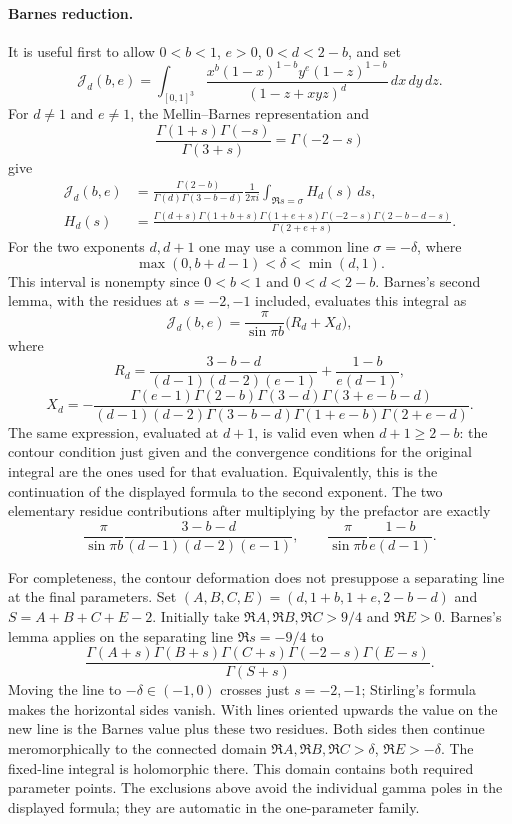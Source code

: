 \documentclass[11pt,a4paper]{article}
\theoremstyle{definition}
\theoremstyle{remark}
\numberwithin{equation}{section}
\begin{document}
\paragraph{Barnes reduction.}
It is useful first to allow $0<b<1$, $e>0$, $0<d<2-b$, and set
\[
 \mathcal J_d(b,e)=\int_{[0,1]^3}
 \frac{x^b(1-x)^{1-b}y^e(1-z)^{1-b}}
 {(1-z+xyz)^d}\,dx\,dy\,dz.
\]
For $d\ne1$ and $e\ne1$, the Mellin--Barnes representation and
\[
 \frac{\Gamma(1+s)\Gamma(-s)}{\Gamma(3+s)}
 =\Gamma(-2-s)
\]
give
\begin{align*}
 \mathcal J_d(b,e)
 &=\frac{\Gamma(2-b)}{\Gamma(d)\Gamma(3-b-d)}\frac{1}{2\pi i}
   \int_{\Re s=\sigma} H_d(s)\,ds,\\
 H_d(s)&=
 \frac{\Gamma(d+s)\Gamma(1+b+s)\Gamma(1+e+s)
       \Gamma(-2-s)\Gamma(2-b-d-s)}{\Gamma(2+e+s)}.
\end{align*}
For the two exponents $d,d+1$ one may use a common line
$\sigma=-\delta$, where
\[
 \max(0,b+d-1)<\delta<\min(d,1).
\]
This interval is nonempty since $0<b<1$ and $0<d<2-b$.
Barnes's second lemma, with the residues at $s=-2,-1$ included,
evaluates this integral as
\begin{equation}
 \mathcal J_d(b,e)=\frac{\pi}{\sin\pi b}\bigl(R_d+X_d\bigr),
 \label{fields-eq:barnes-general-reduction}
\end{equation}
where
\[
 R_d=\frac{3-b-d}{(d-1)(d-2)(e-1)}+
     \frac{1-b}{e(d-1)},
\]
\[
 X_d=-\frac{\Gamma(e-1)\Gamma(2-b)\Gamma(3-d)
                   \Gamma(3+e-b-d)}
 {(d-1)(d-2)\Gamma(3-b-d)\Gamma(1+e-b)\Gamma(2+e-d)}.
\]
The same expression, evaluated at $d+1$, is valid even when
$d+1\ge 2-b$: the contour condition just given and the convergence
conditions for the original integral are the ones used for that
evaluation.  Equivalently, this is the continuation of the displayed
formula to the second exponent.  The two elementary residue
contributions after multiplying by the prefactor are exactly
\[
 \frac{\pi}{\sin\pi b}
 \frac{3-b-d}{(d-1)(d-2)(e-1)},\qquad
 \frac{\pi}{\sin\pi b}\frac{1-b}{e(d-1)}.
\]

For completeness, the contour deformation does not presuppose a
separating line at the final parameters.  Set
$(A,B,C,E)=(d,1+b,1+e,2-b-d)$ and
$S=A+B+C+E-2$.
Initially take $\Re A,\Re B,\Re C>9/4$ and $\Re E>0$.
Barnes's lemma applies on the separating line $\Re s=-9/4$ to
\[
 \frac{\Gamma(A+s)\Gamma(B+s)\Gamma(C+s)
             \Gamma(-2-s)\Gamma(E-s)}{\Gamma(S+s)}.
\]
Moving the line to $-\delta\in(-1,0)$ crosses just $s=-2,-1$;
Stirling's formula makes the horizontal sides vanish.  With lines
oriented upwards the value on the new line is the Barnes value plus
these two residues.  Both sides then continue meromorphically to
the connected domain
$\Re A,\Re B,\Re C>\delta$, $\Re E>-\delta$.
The fixed-line integral is holomorphic there.  This domain contains
both required parameter points.  The exclusions above avoid the
individual gamma poles in the displayed formula; they are automatic
in the one-parameter family.
\end{document}
